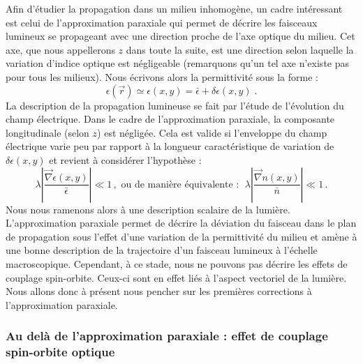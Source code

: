\documentclass[a4paper,11pt]{article} %
\begin{document}
	Afin d'étudier la propagation dans un milieu inhomogène, un cadre intéressant est celui de l'approximation paraxiale qui permet de décrire les faisceaux lumineux se propageant avec une direction proche de l'axe optique du milieu. Cet axe, que nous appellerons $ z $ dans toute la suite, est une direction selon laquelle la variation d'indice optique est négligeable (remarquons qu'un tel axe n'existe pas pour tous les milieux). Nous écrivons alors la permittivité sous la forme :
	\begin{equation*}
		\epsilon(\vec{r}) \simeq \epsilon(x,y) = \bar{\epsilon} + \delta \epsilon(x,y) \; .
	\end{equation*}
	La description de la propagation lumineuse se fait par l'étude de l'évolution du champ électrique. Dans le cadre de l'approximation paraxiale, la composante longitudinale (selon $ z $) est négligée. Cela est valide si l'enveloppe du champ électrique varie peu par rapport à la longueur caractéristique de variation de $\delta \epsilon (x,y)$ et revient à considérer l'hypothèse : 
	\begin{equation}
		\label{hyp_var_epsilon}
		\lambda \left| \frac{\vec{\nabla}\epsilon(x,y)}{\bar{\epsilon}} \right| \ll 1 \, , \text{ ou de manière équivalente : } \; \lambda \left| \frac{\vec{\nabla}n(x,y)}{\bar{n}} \right| \ll 1 \, .
	\end{equation}
	Nous nous ramenons alors à une description scalaire de la lumière.\\
	
	L'approximation paraxiale permet de décrire la déviation du faisceau dans le plan de propagation sous l'effet d'une variation de la permittivité du milieu et amène à une bonne description de la trajectoire d'un faisceau lumineux à l'échelle macroscopique. Cependant, à ce stade, nous ne pouvons pas décrire les effets de couplage spin-orbite. Ceux-ci sont en effet liés à l'aspect vectoriel de la lumière. Nous allons donc à présent nous pencher sur les premières corrections à l'approximation paraxiale.
	
	\subsubsection{Au delà de l'approximation paraxiale : effet de couplage spin-orbite optique}
	
\end{document}
